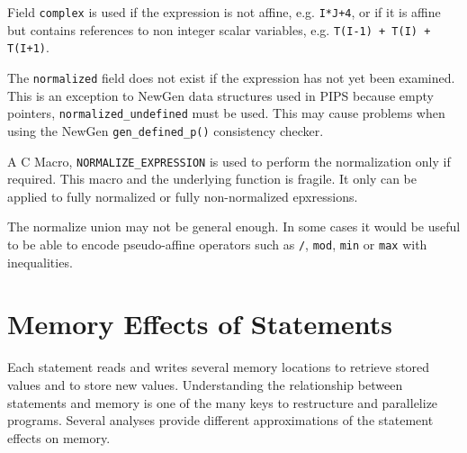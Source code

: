 \documentclass[a4paper]{article}
\begin{document}
\begin{comment}
Le domaine \texttt{normalized} permet de savoir si une expression est une
expression lin�aire construite sur les variables simples enti�res
(sous-domaine \texttt{linear}) ou non (sous-domaine \texttt{complex}).
\end{comment}

Field \verb/complex/ is used if the expression is not affine, e.g. 
\texttt{I*J+4}, or if it is affine but contains references to non integer scalar
variables, e.g. \texttt{T(I-1) + T(I) + T(I+1)}.

\begin{comment}
Le sous-domaine \texttt{complex} est utilis� si l'expression n'est pas
lin�aire (ex: \texttt{I*J+4}) ou si elle est lin�aire mais contient autre
chose que des r�f�rences � des scalaires entiers (ex: \texttt{T(I-1) +
T(I) + T(I+1)}).
\end{comment}

The \verb/normalized/ field does not exist if the expression has not yet
been examined. This is an exception to NewGen data structures used in
PIPS because empty pointers, \verb/normalized_undefined/ must be
used. This may cause problems when using the NewGen
\verb/gen_defined_p()/ consistency checker.

\begin{comment}
La forme normalis�e n'existe pas si l'expression n'a pas encore �t�
examin�e.
\end{comment}

A C Macro, \verb/NORMALIZE_EXPRESSION/ is used to perform the
normalization only if required. This macro and the underlying function
is fragile. It only can be applied to fully normalized or fully
non-normalized epxressions.

The normalize union may not be general enough. In some cases it would be
useful to be able to encode pseudo-affine operators such as \verb+/+,
\verb/mod/, \verb/min/ or \verb/max/ with inequalities.

\section{Memory Effects of Statements}
\label{effects}

Each statement reads and writes several memory locations to retrieve
stored values and to store new values. Understanding the relationship between
statements and memory is one of the many keys to restructure and
parallelize programs. Several analyses provide different approximations
of the statement effects on memory.
\end{document}
